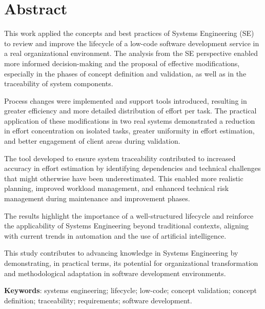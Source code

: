 \chapter*{Abstract}

	\noindent This work applied the concepts and best practices of Systems Engineering (SE) to review and improve the lifecycle of a low-code software development service in a real organizational environment. The analysis from the SE perspective enabled more informed decision-making and the proposal of effective modifications, especially in the phases of concept definition and validation, as well as in the traceability of system components.

	\noindent Process changes were implemented and support tools introduced, resulting in greater efficiency and more detailed distribution of effort per task. The practical application of these modifications in two real systems demonstrated a reduction in effort concentration on isolated tasks, greater uniformity in effort estimation, and better engagement of client areas during validation.

	\noindent The tool developed to ensure system traceability contributed to increased accuracy in effort estimation by identifying dependencies and technical challenges that might otherwise have been underestimated. This enabled more realistic planning, improved workload management, and enhanced technical risk management during maintenance and improvement phases.

	\noindent The results highlight the importance of a well-structured lifecycle and reinforce the applicability of Systems Engineering beyond traditional contexts, aligning with current trends in automation and the use of artificial intelligence.

	\noindent This study contributes to advancing knowledge in Systems Engineering by demonstrating, in practical terms, its potential for organizational transformation and methodological adaptation in software development environments.

	
	\vspace{5mm}
	
	\noindent\textbf{Keywords}: systems engineering; lifecycle; low-code; concept validation; concept definition; traceability; requirements; software development.

	
	\thispagestyle{empty}
	